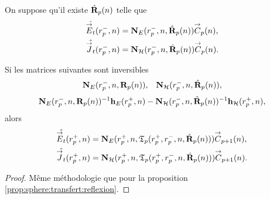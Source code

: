     \begin{prop}%
      \label{prop:sphere:relevement:reflexion}
      On suppose qu'il existe \(\hat{\mathbf{R}}_{p}(n)\) telle que 
      \begin{align*}
        \hat{{\overset{\rightarrow}{E}}_t}(r_{p}^-,n) &= \mathbf{N}_{E}(r_p^-,n,\hat{\mathbf{R}}_{p}(n)){\overset{\rightarrow}{C}}_{p}(n),
        \\
        \hat{{\overset{\rightarrow}{J}}_t}(r_{p}^-,n) &= \mathbf{N}_{\mathcal{H}}(r_p^-,n,\hat{\mathbf{R}}_{p}(n)){\overset{\rightarrow}{C}}_{p}(n).
      \end{align*}

      Si les matrices suivantes sont inversibles
      \begin{align*}
        \mathbf{N}_{E}(r_p^-,n,\mathbf{R}_{p}(n)), && \mathbf{N}_{\mathcal{H}}(r_p^-,n,\hat{\mathbf{R}}_{p}(n)),
      \end{align*}
      \begin{align*}
        \mathbf{N}_{E}(r_p^-,n,\mathbf{R}_{p}(n))^{-1}\mathbf{h}_{E}(r_p^+,n) - \mathbf{N}_{\mathcal{H}}(r_p^-,n,\hat{\mathbf{R}}_{p}(n))^{-1}\mathbf{h}_{\mathcal{H}}(r_p^+,n),
      \end{align*}
      alors
      \begin{align*}
        \hat{{\overset{\rightarrow}{E}}_t}(r_{p}^+,n) &= \mathbf{N}_{E}(r_p^+,n,\mathfrak{T}_p(r_p^+,r_p^-,n,\hat{\mathbf{R}}_{p}(n))){\overset{\rightarrow}{C}}_{p+1}(n),
        \\
        \hat{{\overset{\rightarrow}{J}}_t}(r_{p}^+,n) &= \mathbf{N}_{\mathcal{H}}(r_p^+,n,\mathfrak{T}_p(r_p^+,r_p^-,n,\hat{\mathbf{R}}_{p}(n))){\overset{\rightarrow}{C}}_{p+1}(n).
      \end{align*}
    \end{prop}

    \begin{proof}
      Même méthodologie que pour la proposition \ref{prop:sphere:transfert:reflexion}.
    \end{proof}

